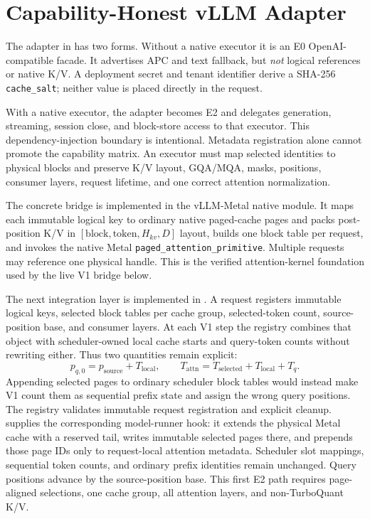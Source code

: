 \documentclass[10pt]{article}
\begin{document}
\section{Capability-Honest vLLM Adapter}
The adapter in  has two forms. Without a native
executor it is an E0 OpenAI-compatible facade. It advertises APC and text
fallback, but \emph{not} logical references or native K/V. A deployment secret
and tenant identifier derive a SHA-256 \texttt{cache\_salt}; neither value is
placed directly in the request.

With a native executor, the adapter becomes E2 and delegates generation,
streaming, session close, and block-store access to that executor. This
dependency-injection boundary is intentional. Metadata registration alone
cannot promote the capability matrix. An executor must map selected identities
to physical blocks and preserve K/V layout, GQA/MQA, masks, positions, consumer
layers, request lifetime, and one correct attention normalization.

The concrete bridge is implemented in the vLLM-Metal native module. It maps
each immutable logical key to ordinary native paged-cache pages and packs post-position
K/V in $[\text{block},\text{token},H_{kv},D]$ layout, builds one block table per
request, and invokes the native Metal \texttt{paged\_attention\_primitive}.
Multiple requests may reference one physical handle. This is the verified
attention-kernel foundation used by the live V1 bridge below.

The next integration layer is implemented in
. A request registers immutable logical keys,
selected block tables per cache group, selected-token count, source-position
base, and consumer layers. At each V1 step the registry combines that object
with scheduler-owned local cache starts and query-token counts without rewriting
either. Thus two quantities remain explicit:
\[
 p_{q,0}=p_{\mathrm{source}}+T_{\mathrm{local}},\qquad
 T_{\mathrm{attn}}=T_{\mathrm{selected}}+T_{\mathrm{local}}+T_q.
\]
Appending selected pages to ordinary scheduler block tables would instead make
V1 count them as sequential prefix state and assign the wrong query positions.
The registry validates immutable request registration and explicit cleanup.
 supplies the corresponding model-runner hook:
it extends the physical Metal cache with a reserved tail, writes immutable
selected pages there, and prepends those page IDs only to request-local
attention metadata. Scheduler slot mappings, sequential token counts, and
ordinary prefix identities remain unchanged. Query positions advance by the
source-position base. This first E2 path requires page-aligned selections, one
cache group, all attention layers, and non-TurboQuant K/V.
\end{document}
